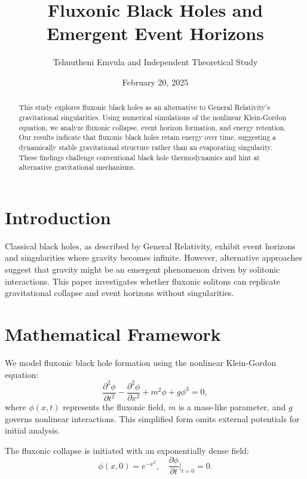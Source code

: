\documentclass{article}
\title{Fluxonic Black Holes and Emergent Event Horizons}
\author{Tshuutheni Emvula and Independent Theoretical Study}
\date{February 20, 2025}
\begin{document}
\maketitle

\begin{abstract}
This study explores fluxonic black holes as an alternative to General Relativity's gravitational singularities. Using numerical simulations of the nonlinear Klein-Gordon equation, we analyze fluxonic collapse, event horizon formation, and energy retention. Our results indicate that fluxonic black holes retain energy over time, suggesting a dynamically stable gravitational structure rather than an evaporating singularity. These findings challenge conventional black hole thermodynamics and hint at alternative gravitational mechanisms.
\end{abstract}

\section{Introduction}
Classical black holes, as described by General Relativity, exhibit event horizons and singularities where gravity becomes infinite. However, alternative approaches suggest that gravity might be an emergent phenomenon driven by solitonic interactions. This paper investigates whether fluxonic solitons can replicate gravitational collapse and event horizons without singularities.

\section{Mathematical Framework}
We model fluxonic black hole formation using the nonlinear Klein-Gordon equation:
\begin{equation}
    \frac{\partial^2 \phi}{\partial t^2} - \frac{\partial^2 \phi}{\partial x^2} + m^2 \phi + g \phi^3 = 0,
\end{equation}
where \(\phi(x,t)\) represents the fluxonic field, \(m\) is a mass-like parameter, and \(g\) governs nonlinear interactions. This simplified form omits external potentials for initial analysis.

The fluxonic collapse is initiated with an exponentially dense field:
\begin{equation}
    \phi(x,0) = e^{-x^2}, \quad \frac{\partial \phi}{\partial t} \Big|_{t=0} = 0.
\end{equation}
\end{document}
